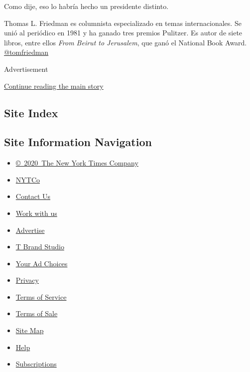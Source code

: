 Como dije, eso lo habría hecho un presidente distinto.

Thomas L. Friedman es columnista especializado en temas internacionales.
Se unió al periódico en 1981 y ha ganado tres premios Pulitzer. Es autor
de siete libros, entre ellos \emph{From Beirut to Jerusalem}, que ganó
el National Book Award.
\href{https://twitter.com/tomfriedman}{@tomfriedman}

Advertisement

\protect\hyperlink{after-bottom}{Continue reading the main story}

\hypertarget{site-index}{%
\subsection{Site Index}\label{site-index}}

\hypertarget{site-information-navigation}{%
\subsection{Site Information
Navigation}\label{site-information-navigation}}

\begin{itemize}
\tightlist
\item
  \href{https://help.nytimes.com/hc/en-us/articles/115014792127-Copyright-notice}{©~2020~The
  New York Times Company}
\end{itemize}

\begin{itemize}
\tightlist
\item
  \href{https://www.nytco.com/}{NYTCo}
\item
  \href{https://help.nytimes.com/hc/en-us/articles/115015385887-Contact-Us}{Contact
  Us}
\item
  \href{https://www.nytco.com/careers/}{Work with us}
\item
  \href{https://nytmediakit.com/}{Advertise}
\item
  \href{http://www.tbrandstudio.com/}{T Brand Studio}
\item
  \href{https://www.nytimes.com/privacy/cookie-policy\#how-do-i-manage-trackers}{Your
  Ad Choices}
\item
  \href{https://www.nytimes.com/privacy}{Privacy}
\item
  \href{https://help.nytimes.com/hc/en-us/articles/115014893428-Terms-of-service}{Terms
  of Service}
\item
  \href{https://help.nytimes.com/hc/en-us/articles/115014893968-Terms-of-sale}{Terms
  of Sale}
\item
  \href{https://spiderbites.nytimes.com}{Site Map}
\item
  \href{https://help.nytimes.com/hc/en-us}{Help}
\item
  \href{https://www.nytimes.com/subscription?campaignId=37WXW}{Subscriptions}
\end{itemize}
